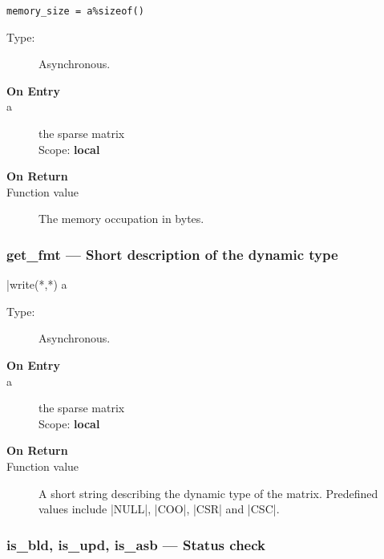 \begin{verbatim}
memory_size = a%sizeof()
\end{verbatim}

\begin{description}
\item[Type:] Asynchronous.
\item[\bf On Entry]
\item[a] the sparse matrix\\
Scope: {\bf local}\\
\end{description}

\begin{description}
\item[\bf On Return]
\item[Function value] The memory occupation in bytes.
\end{description}


\subsubsection{get\_fmt  --- Short description of the dynamic type}


\fortinline|write(*,*) a%


\begin{description}
\item[Type:] Asynchronous.
\item[\bf On Entry]
\item[a] the sparse matrix\\
Scope: {\bf local}\\
\end{description}

\begin{description}
\item[\bf On Return]
\item[Function value] A short string describing the dynamic type of
  the matrix. Predefined values include \fortinline|NULL|, \fortinline|COO|,
  \fortinline|CSR| and \fortinline|CSC|. 
\end{description}

\subsubsection{is\_bld, is\_upd, is\_asb  --- Status check}



